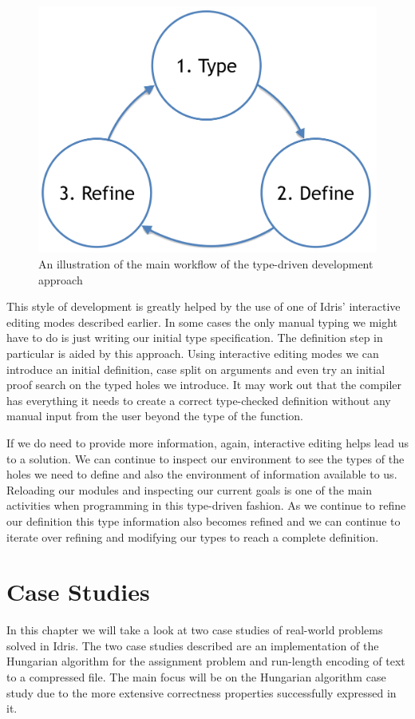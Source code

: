 \documentclass[a4paper, notitlepage]{report}
\begin{document}
\begin{figure}[H]
\centering
\includegraphics[width=0.8\linewidth]{./fig/tdd_cycle.png}
\caption{An illustration of the main workflow of the type-driven development approach}
\end{figure}

This style of development is greatly helped by the use of one of Idris'
interactive editing modes described earlier. In some cases the only manual
typing we might have to do is just writing our initial type specification. The
definition step in particular is aided by this approach. Using interactive
editing modes we can introduce an initial definition, case split on arguments
and even try an initial proof search on the typed holes we introduce. It may
work out that the compiler has everything it needs to create a correct
type-checked definition without any manual input from the user beyond the type
of the function.

If we do need to provide more information, again, interactive editing helps lead
us to a solution. We can continue to inspect our environment to see the types of
the holes we need to define and also the environment of information available to
us. Reloading our modules and inspecting our current goals is one of the main
activities when programming in this type-driven fashion. As we continue to
refine our definition this type information also becomes refined and we can
continue to iterate over refining and modifying our types to reach a complete
definition.
\chapter{Case Studies}
\label{sec:orgd68a3f5}
In this chapter we will take a look at two case studies of real-world problems
solved in Idris. The two case studies described are an implementation of the
Hungarian algorithm for the assignment problem and run-length encoding of text
to a compressed file. The main focus will be on the Hungarian algorithm case
study due to the more extensive correctness properties successfully expressed in
it.
\end{document}

